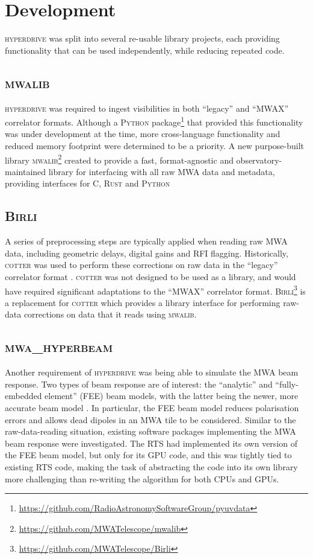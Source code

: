 \documentclass[summary]{ursi}
\newcommand{\hyperdrive}{\textsc{hyperdrive}}\newcommand{\mwalib}{\textsc{mwalib}}
\newcommand{\birli}{\textsc{Birli}}
\newcommand{\rts}{\textsc{RTS}}
\newcommand{\cotter}{\textsc{cotter}}
\newcommand{\clang}{\textsc{C}}
\newcommand{\python}{\textsc{Python}}
\newcommand{\rust}{\textsc{Rust}}
\begin{document}
\section{Development}
\hyperdrive{} was split into several re-usable library projects, each providing functionality that can be used independently, while reducing repeated code.
\subsection{\mwalib{}}
\hyperdrive{} was required to ingest visibilities in both ``legacy'' and ``MWAX'' correlator formats. 
Although a \python{} package\footnote{\url{https://github.com/RadioAstronomySoftwareGroup/pyuvdata}} that provided this functionality was under development at the time, more cross-language functionality and reduced memory footprint were determined to be a priority. 
A new purpose-built library \mwalib{}\footnote{\url{https://github.com/MWATelescope/mwalib}} created to provide a fast, format-agnostic and observatory-maintained library for interfacing with all raw MWA data and metadata, providing interfaces for \clang{}, \rust{} and \python{}

\subsection{\birli{}}
A series of preprocessing steps are typically applied when reading raw MWA data, including geometric delays, digital gains and RFI flagging. 
Historically, \cotter{} was used to perform these corrections on raw data in the ``legacy'' correlator format \cite{Offringa2015}.
\cotter{} was not designed to be used as a library, and would have required significant adaptations to the ``MWAX'' correlator format.
\birli{}\footnote{\url{https://github.com/MWATelescope/Birli}} is a replacement for \cotter{} which provides a library interface for performing raw-data corrections on data that it reads using \mwalib{}. 

\subsection{\textsc{mwa\_hyperbeam}}
Another requirement of \hyperdrive{} was being able to simulate the MWA beam response. 
Two types of beam response are of interest: the ``analytic'' and ``fully-embedded element'' (FEE) beam models, with the latter being the newer, more accurate beam model \cite{sokolowski2017}. 
In particular, the FEE beam model reduces polarisation errors and allows dead dipoles in an MWA tile to be considered. 
Similar to the raw-data-reading situation, existing software packages implementing the MWA beam response were investigated. 
The \rts{} had implemented its own version of the FEE beam model, but only for its GPU code, and this was tightly tied to existing \rts{} code, making the task of abstracting the code into its own library more challenging than re-writing the algorithm for both CPUs and GPUs.
\end{document}
